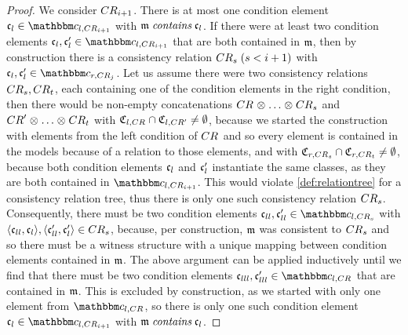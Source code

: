 \begin{proof}
    We consider $\consistencyrelation{CR}{i+1}$.
    There is at most one condition element $\conditionelement{c}{l} \in \condition{c}{l, \consistencyrelation{CR}{i+1}}$ with $\modeltuple{m} \containsmath \conditionelement{c}{l}$.
    If there were at least two condition elements $\conditionelement{c}{l}, \conditionelement{c}{l}' \in \condition{c}{l,\consistencyrelation{CR}{i+1}}$ that are both contained in $\modeltuple{m}$, then by construction there is a consistency relation $\consistencyrelation{CR}{s}\; (s < i+1)$ with $\conditionelement{c}{l},\conditionelement{c}{l}' \in \condition{c}{r,\consistencyrelation{CR}{j}}$.
    Let us assume there were two consistency relations $\consistencyrelation{CR}{s}, \consistencyrelation{CR}{t}$, each containing one of the condition elements in the right condition, then there would be non-empty concatenations $\consistencyrelation{CR}{} \concat \dots \concat \consistencyrelation{CR}{s}$ and $\consistencyrelation{CR}{}' \concat \dots \concat \consistencyrelation{CR}{t}$ with $\classtuple{C}{l,\consistencyrelation{CR}{}} \cap \classtuple{C}{l,\consistencyrelation{CR}{}'} \neq \emptyset$, because we started the construction with elements from the left condition of $\consistencyrelation{CR}{}$ and so every element is contained in the models because of a relation to those elements, and with $\classtuple{C}{r,\consistencyrelation{CR}{s}} \cap \classtuple{C}{r,\consistencyrelation{CR}{t}} \neq \emptyset$, because both condition elements $\conditionelement{c}{l}$ and $\conditionelement{c}{l}'$ instantiate the same classes, as they are both contained in $\condition{c}{l,\consistencyrelation{CR}{i+1}}$.
    This would violate \autoref{def:relationtree} for a consistency relation tree, thus there is only one such consistency relation $\consistencyrelation{CR}{s}$.
    Consequently, there must be two condition elements $\conditionelement{c}{ll}, \conditionelement{c}{ll}' \in \condition{c}{l,\consistencyrelation{CR}{s}}$ with $\tupled{\conditionelement{c}{ll},\conditionelement{c}{l}}, \tupled{\conditionelement{c}{ll}',\conditionelement{c}{l}'} \in \consistencyrelation{CR}{s}$, because, per construction, $\modeltuple{m}$ was consistent to $\consistencyrelation{CR}{s}$ and so there must be a witness structure with a unique mapping between condition elements contained in $\modeltuple{m}$.
    The above argument can be applied inductively until we find that there must be two condition elements $\conditionelement{c}{lll},\conditionelement{c}{lll}' \in \condition{c}{l,\consistencyrelation{CR}{}}$ that are contained in $\modeltuple{m}$.
    This is excluded by construction, as we started with only one element from $\condition{c}{l,\consistencyrelation{CR}{}}$, so there is only one such condition element $\conditionelement{c}{l} \in \condition{c}{l,\consistencyrelation{CR}{i+1}}$ with $\modeltuple{m} \containsmath \conditionelement{c}{l}$.
    

\end{proof}
